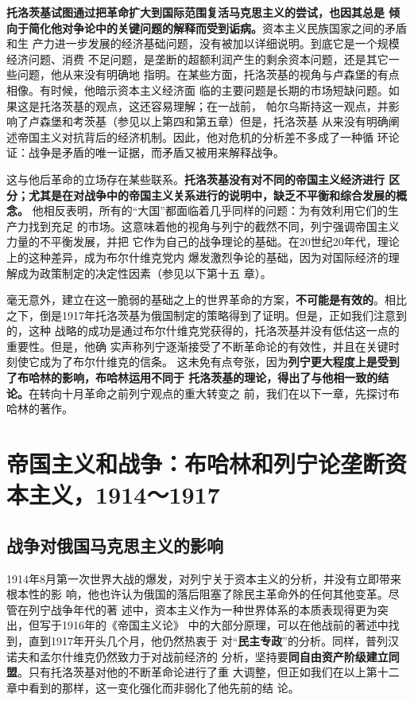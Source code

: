 \textbf{托洛茨基试图通过把革命扩大到国际范围复活马克思主义的尝试，也因其总是
倾向于简化他对争论中的关键问题的解释而受到诟病。}资本主义民族国家之间的矛盾和生
产力进一步发展的经济基础问题，没有被加以详细说明。到底它是一个规模经济问题、消费
不足问题，是垄断的超额利润产生的剩余资本问题，还是其它一些问题，他从来没有明确地
指明。在某些方面，托洛茨基的视角与卢森堡的有点相像。有时候，他暗示资本主义经济面
临的主要问题是长期的市场短缺问题。如果这是托洛茨基的观点，这还容易理解；在一战前，
帕尔乌斯持这一观点，并影响了卢森堡和考茨基（参见以上第四和第五章）但是，托洛茨基
从来没有明确阐述帝国主义对抗背后的经济机制。因此，他对危机的分析差不多成了一种循
环论证：战争是矛盾的唯一证据，而矛盾又被用来解释战争。

这与他后革命的立场存在某些联系。\textbf{托洛茨基没有对不同的帝国主义经济进行
区分；尤其是在对战争中的帝国主义关系进行的说明中，缺乏不平衡和综合发展的概念。}
他相反表明，所有的“大国”都面临着几乎同样的问题：为有效利用它们的生产力找到充足
的市场。这意味着他的视角与列宁的截然不同，列宁强调帝国主义力量的不平衡发展，并把
它作为自己的战争理论的基础。在20世纪20年代，理论上的这种差异，成为布尔什维克党内
爆发激烈争论的基础，因为对国际经济的理解成为政策制定的决定性因素（参见以下第十五
章）。

毫无意外，建立在这一脆弱的基础之上的世界革命的方案，\textbf{不可能是有效的}。相比
之下，倒是1917年托洛茨基为俄国制定的策略得到了证明。但是，正如我们注意到的，这种
战略的成功是通过布尔什维克党获得的，托洛茨基并没有低估这一点的重要性。但是，他确
实声称列宁逐渐接受了不断革命论的有效性，并且在关键时刻使它成为了布尔什维克的信条。
这未免有点夸张，因为\textbf{列宁更大程度上是受到了布哈林的影响，布哈林运用不同于
  托洛茨基的理论，得出了与他相一致的结论。}在转向十月革命之前列宁观点的重大转变之
前，我们在以下一章，先探讨布哈林的著作。


\chapter{帝国主义和战争：布哈林和列宁论垄断资本主义，1914～1917}

\section{战争对俄国马克思主义的影响}

1914年8月第一次世界大战的爆发，对列宁关于资本主义的分析，并没有立即带来根本性的影
响，他也许认为俄国的落后阻塞了除民主革命外的任何其他变革。尽管在列宁战争年代的著
述中，资本主义作为一种世界体系的本质表现得更为突出，但写于1916年的《帝国主义论》
中的大部分原理，可以在他战前的著述中找到，直到1917年开头几个月，他仍然热衷于
对“\textbf{民主专政}”的分析。同样，普列汉诺夫和孟尔什维克仍然致力于对战前经济的
分析，坚持要\textbf{同自由资产阶级建立同盟}。只有托洛茨基对他的不断革命论进行了重
大调整，但正如我们在以上第十二章中看到的那样，这一变化强化而非弱化了他先前的结
论。

